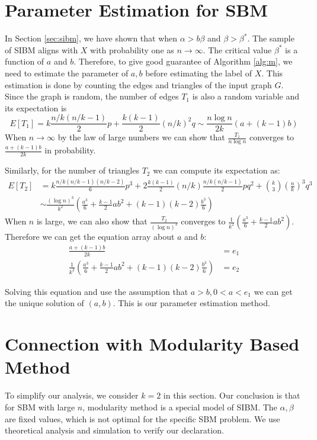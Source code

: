 \documentclass{article}
\begin{document}
	\section{Parameter Estimation for SBM}
	In Section \ref{sec:sibm}, we have shown that when $\alpha > b \beta$ and $\beta > \beta^*$. The sample of SIBM aligns with $X$ with probability one
	as $n\to \infty$. 
	The critical value $\beta^*$ is a function of $a$ and $b$. Therefore, to give good guarantee of Algorithm \ref{alg:m}, we need to estimate the parameter
	of $a,b$ before estimating the label of $X$.
	This estimation is done by counting the edges and triangles of the input graph $G$.
	Since the graph is random, the number of edges $T_1$ is also a random variable and its expectation is
	\begin{equation}
	E[T_1] = k \frac{n/k(n/k-1)}{2} p + \frac{k(k-1)}{2} (n/k)^2 q \sim \frac{n\log n}{2k} (a + (k-1) b)
	\end{equation}
	When $n \to \infty$ by the law of large numbers we can show that $\frac{T_1}{n \log n}$ converges to $\frac{a+(k-1)b}{2k}$ in probability.
	
	Similarly, for the number of triangles $T_2$ we can compute its expectation as:
	\begin{align}
	E[T_2] &= k \frac{n/k(n/k-1)(n/k-2)}{6}p^3 + 2\frac{k(k-1)}{2}(n/k) \frac{n/k(n/k-1)}{2} pq^2 + \binom{k}{3} \left(\frac{n}{k}\right)^3 q^3 \\
	&\sim \frac{(\log n)^3}{k^2}
	(\frac{a^3}{6} + \frac{k-1}{2}ab^2 + (k-1)(k-2)\frac{b^3}{6})
	\end{align}
	When $n$ is large, we can also show that $\frac{T_2}{(\log n)^3}$ converges to $\frac{1}{k^2}
	(\frac{a^3}{6} + \frac{k-1}{2}ab^2)$. Therefore we can get the equation array about $a$ and $b$:
	\begin{align}
	\frac{a+(k-1)b}{2k} & = e_1 \label{eq:e_1}\\
	\frac{1}{k^2}
	\left(\frac{a^3}{6} + \frac{k-1}{2}ab^2 + (k-1)(k-2)\frac{b^3}{6}\right) & = e_2 \label{eq:e_2}
	\end{align}	
	
	Solving this equation and use the assumption that $ a > b, 0 < a < e_1$ we can get the unique solution of $(a,b)$.
	This is our parameter estimation method.
	\section{Connection with Modularity Based Method}
	To simplify our analysis, we consider $k=2$ in this section. Our conclusion is that for SBM with large $n$, modularity method
	is a special model of SIBM. The $\alpha, \beta$ are fixed values, which is not optimal for the specific SBM problem. We use theoretical
	analysis and simulation to verify our declaration.
\end{document}
